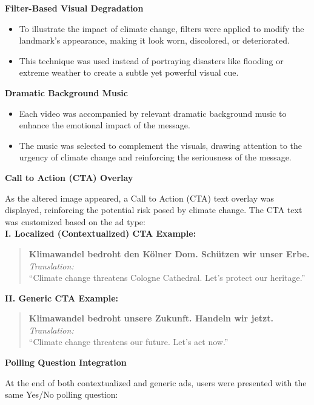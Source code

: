 \documentclass[a4paper,11pt]{article}
\begin{document}
\noindent \textbf{Filter-Based Visual Degradation}
\begin{itemize}
    \item To illustrate the impact of climate change, filters were applied to modify the landmark’s appearance, making it look worn, discolored, or deteriorated.
    \item This technique was used instead of portraying disasters like flooding or extreme weather to create a subtle yet powerful visual cue.
\end{itemize}

\noindent \textbf{Dramatic Background Music}
\begin{itemize}
    \item Each video was accompanied by relevant dramatic background music to enhance the emotional impact of the message.
    \item The music was selected to complement the visuals, drawing attention to the urgency of climate change and reinforcing the seriousness of the message.
\end{itemize}

\noindent \textbf{Call to Action (CTA) Overlay}

As the altered image appeared, a Call to Action (CTA) text overlay was displayed, reinforcing the potential risk posed by climate change. The CTA text was customized based on the ad type:\\

\textbf{I. Localized (Contextualized) CTA Example:}
\begin{quote}
    \textbf{Klimawandel bedroht den Kölner Dom. Schützen wir unser Erbe.} \\
    \textit{Translation:} \\
    “Climate change threatens Cologne Cathedral. Let’s protect our heritage.”
\end{quote}

\textbf{II. Generic CTA Example:}
\begin{quote}
    \textbf{Klimawandel bedroht unsere Zukunft. Handeln wir jetzt.} \\
    \textit{Translation:} \\
    “Climate change threatens our future. Let’s act now.”
\end{quote}

\noindent \textbf{Polling Question Integration}

At the end of both contextualized and generic ads, users were presented with the same Yes/No polling question:
\end{document}
